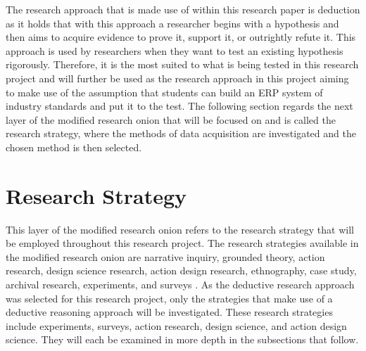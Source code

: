 \par{The research approach that is made use of within this research paper is deduction as it holds that with this approach a researcher begins with a hypothesis and then aims to acquire evidence to prove it, support it, or outrightly refute it. This approach is used by researchers when they want to test an existing hypothesis rigorously. Therefore, it is the most suited to what is being tested in this research project and will further be used as the research approach in this project aiming to make use of the assumption that students can build an ERP system of industry standards and put it to the test. The following section regards the next layer of the modified research onion that will be focused on and is called the research strategy, where the methods of data acquisition are investigated and the chosen method is then selected.}


\section{Research Strategy}
\par{This layer of the modified research onion refers to the research strategy that will be employed throughout this research project. The research strategies available in the modified research onion are narrative inquiry, grounded theory, action research, design science research, action design research, ethnography, case study, archival research, experiments, and surveys \citep{mardiana2020modifying}. As the deductive research approach was selected for this research project, only the strategies that make use of a deductive reasoning approach will be investigated. These research strategies include experiments, surveys, action research, design science, and action design science. They will each be examined in more depth in the subsections that follow.}
